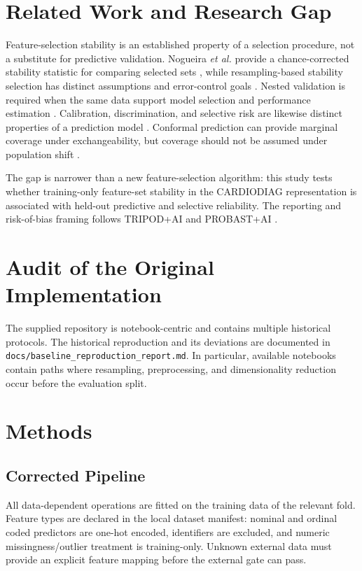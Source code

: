 \documentclass[journal]{IEEEtran}
\begin{document}
\section{Related Work and Research Gap}
Feature-selection stability is an established property of a selection procedure,
not a substitute for predictive validation. Nogueira \emph{et al.} provide a
chance-corrected stability statistic for comparing selected sets
\cite{nogueira2018stability}, while resampling-based stability selection has
distinct assumptions and error-control goals \cite{meinshausen2010stability}.
Nested validation is required when the same data support model selection and
performance estimation \cite{varma2006bias,cawley2010overfitting}. Calibration,
discrimination, and selective risk are likewise distinct properties of a
prediction model \cite{vancalster2019calibration}. Conformal prediction can
provide marginal coverage under exchangeability, but coverage should not be
assumed under population shift \cite{angelopoulos2023conformal}.

The gap is narrower than a new feature-selection algorithm: this study tests
whether training-only feature-set stability in the CARDIODIAG representation is
associated with held-out predictive and selective reliability. The reporting
and risk-of-bias framing follows TRIPOD+AI and PROBAST+AI
\cite{collins2024tripodai,moons2025probastai}.

\section{Audit of the Original Implementation}
The supplied repository is notebook-centric and contains multiple historical
protocols. The historical reproduction and its deviations are documented in
\texttt{docs/baseline\_reproduction\_report.md}. In particular, available
notebooks contain paths where resampling, preprocessing, and dimensionality
reduction occur before the evaluation split.

\section{Methods}
\subsection{Corrected Pipeline}
All data-dependent operations are fitted on the training data of the relevant
fold. Feature types are declared in the local dataset manifest: nominal and
ordinal coded predictors are one-hot encoded, identifiers are excluded, and
numeric missingness/outlier treatment is training-only. Unknown external data
must provide an explicit feature mapping before the external gate can pass.
\end{document}
